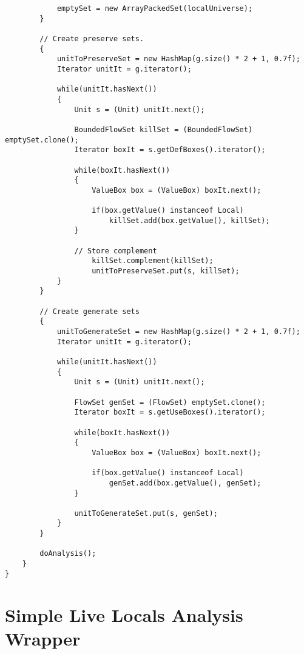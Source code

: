 \documentclass{article}
\begin{document}
\begin{verbatim}
            emptySet = new ArrayPackedSet(localUniverse);            
        }

        // Create preserve sets.
        {
            unitToPreserveSet = new HashMap(g.size() * 2 + 1, 0.7f);
            Iterator unitIt = g.iterator();

            while(unitIt.hasNext())
            {
                Unit s = (Unit) unitIt.next();

                BoundedFlowSet killSet = (BoundedFlowSet) emptySet.clone();
                Iterator boxIt = s.getDefBoxes().iterator();

                while(boxIt.hasNext())
                {
                    ValueBox box = (ValueBox) boxIt.next();

                    if(box.getValue() instanceof Local)
                        killSet.add(box.getValue(), killSet);
                }

                // Store complement
                    killSet.complement(killSet);
                    unitToPreserveSet.put(s, killSet);
            }
        }

        // Create generate sets
        {
            unitToGenerateSet = new HashMap(g.size() * 2 + 1, 0.7f);
            Iterator unitIt = g.iterator();

            while(unitIt.hasNext())
            {
                Unit s = (Unit) unitIt.next();

                FlowSet genSet = (FlowSet) emptySet.clone();
                Iterator boxIt = s.getUseBoxes().iterator();

                while(boxIt.hasNext())
                {
                    ValueBox box = (ValueBox) boxIt.next();

                    if(box.getValue() instanceof Local)
                        genSet.add(box.getValue(), genSet);
                }

                unitToGenerateSet.put(s, genSet);
            }
        }

        doAnalysis();
    }
}
\end{verbatim}

\section{Simple Live Locals Analysis Wrapper}
\label{simpleAnalysisWrapper}
\end{document}
